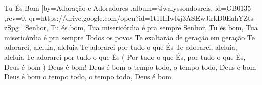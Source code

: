 \beginsong
{Tu És Bom %
}[by={Adoração e Adoradores %
},album={@walyssondosreis},
id={GB0135 %
},rev={0}, %
qr={https://drive.google.com/open?id=1t1HfIwl4j3ASEwJirkD0EahYZts-zSpg %
}]
\beginverse*
Senhor, Tu és bom, Tua misericórdia é pra sempre
Senhor, Tu és bom, Tua misericórdia é pra sempre
Todos os povos Te exaltarão de geração em geração
\endverse
\beginchorus
Te adorarei, aleluia, aleluia
Te adorarei por tudo o que És
Te adorarei, aleluia, aleluia
Te adorarei por tudo o que És
( Por tudo o que És, por tudo o que És, Deus é bom )
\endchorus
\beginverse*
Deus é bom!
\endverse
\beginverse*
Deus é bom o tempo todo, o tempo todo, Deus é bom
Deus é bom o tempo todo, o tempo todo, Deus é bom
\endverse
\vspace{4em} %
\begin{comment}
\lstset{basicstyle=\scriptsize\bf} %
\tab{Solo 1}
\begin{lstlisting}
E|-----------------------------------------------------|
B|-----------------------------------------------------|
G|-----------------------------------------------------|
D|-----------------------------------------------------|
A|-----------------------------------------------------|
E|-----------------------------------------------------|
\end{lstlisting}
\end{comment}
 
